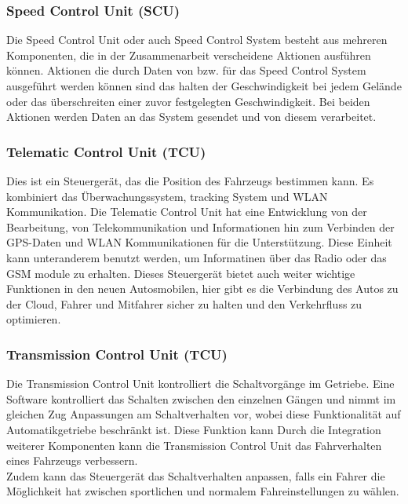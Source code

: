         \subsubsection{Speed Control Unit (SCU)}
        Die Speed Control Unit oder auch Speed Control System besteht aus mehreren Komponenten, die in der Zusammenarbeit
        verscheidene Aktionen ausführen können. Aktionen die durch Daten von bzw. für das Speed Control System ausgeführt
        werden können sind das halten der Geschwindigkeit bei jedem Gelände oder das überschreiten einer zuvor festgelegten
        Geschwindigkeit. Bei beiden Aktionen werden Daten an das System gesendet und von diesem verarbeitet.
        ~\cite{SCU.PB1}

        \subsubsection{Telematic Control Unit (TCU)}
        Dies ist ein Steuergerät, das die Position des Fahrzeugs bestimmen kann. Es kombiniert das Überwachungssystem,
        tracking System und WLAN Kommunikation. Die Telematic Control Unit hat eine Entwicklung von der Bearbeitung, von
        Telekommunikation und Informationen hin zum Verbinden der GPS-Daten und WLAN Kommunikationen für die Unterstützung.
        Diese Einheit kann unteranderem benutzt werden, um Informatinen über das Radio oder das GSM module zu erhalten.
        Dieses Steuergerät bietet auch weiter wichtige Funktionen in den neuen Autosmobilen, hier gibt es die Verbindung
        des Autos zu der Cloud, Fahrer und Mitfahrer sicher zu halten und den Verkehrfluss zu optimieren.
        ~\cite{telematiccontrol.PB1} ~\cite{telematiccontrol.PB2} ~\cite{telematiccontrol.PB3}

        \subsubsection{Transmission Control Unit (TCU)}
        Die Transmission Control Unit kontrolliert die Schaltvorgänge im Getriebe. Eine Software kontrolliert das Schalten
        zwischen den einzelnen Gängen und nimmt im gleichen Zug Anpassungen am Schaltverhalten vor, wobei diese Funktionalität auf Automatikgetriebe beschränkt ist. Diese Funktion kann
        Durch die Integration weiterer Komponenten kann die Transmission Control Unit das Fahrverhalten eines Fahrzeugs verbessern.\\
        Zudem kann das Steuergerät das Schaltverhalten anpassen, falls ein Fahrer die Möglichkeit hat zwischen sportlichen und normalem Fahreinstellungen zu wählen.
        ~\cite{transmissioncontrol.PB1} ~\cite{transmissioncontrol.PB2}

